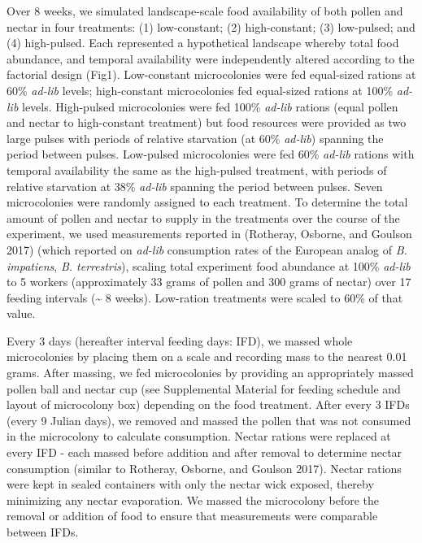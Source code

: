\documentclass[11pt,]{article}
\begin{document}
Over 8 weeks, we simulated landscape-scale food availability of both
pollen and nectar in four treatments: (1) low-constant; (2)
high-constant; (3) low-pulsed; and (4) high-pulsed. Each represented a
hypothetical landscape whereby total food abundance, and temporal
availability were independently altered according to the factorial
design (Fig1). Low-constant microcolonies were fed equal-sized rations
at 60\% \emph{ad-lib} levels; high-constant microcolonies fed
equal-sized rations at 100\% \emph{ad-lib} levels. High-pulsed
microcolonies were fed 100\% \emph{ad-lib} rations (equal pollen and
nectar to high-constant treatment) but food resources were provided as
two large pulses with periods of relative starvation (at 60\%
\emph{ad-lib}) spanning the period between pulses. Low-pulsed
microcolonies were fed 60\% \emph{ad-lib} rations with temporal
availability the same as the high-pulsed treatment, with periods of
relative starvation at 38\% \emph{ad-lib} spanning the period between
pulses. Seven microcolonies were randomly assigned to each treatment. To
determine the total amount of pollen and nectar to supply in the
treatments over the course of the experiment, we used measurements
reported in (Rotheray, Osborne, and Goulson 2017) (which reported on
\emph{ad-lib} consumption rates of the European analog of \emph{B.
impatiens}, \emph{B. terrestris}), scaling total experiment food
abundance at 100\% \emph{ad-lib} to 5 workers (approximately 33 grams of
pollen and 300 grams of nectar) over 17 feeding intervals
(\textasciitilde{} 8 weeks). Low-ration treatments were scaled to 60\%
of that value.

Every 3 days (hereafter interval feeding days: IFD), we massed whole
microcolonies by placing them on a scale and recording mass to the
nearest 0.01 grams. After massing, we fed microcolonies by providing an
appropriately massed pollen ball and nectar cup (see Supplemental
Material for feeding schedule and layout of microcolony box) depending
on the food treatment. After every 3 IFDs (every 9 Julian days), we
removed and massed the pollen that was not consumed in the microcolony
to calculate consumption. Nectar rations were replaced at every IFD -
each massed before addition and after removal to determine nectar
consumption (similar to Rotheray, Osborne, and Goulson 2017). Nectar
rations were kept in sealed containers with only the nectar wick
exposed, thereby minimizing any nectar evaporation. We massed the
microcolony before the removal or addition of food to ensure that
measurements were comparable between IFDs.
\end{document}
